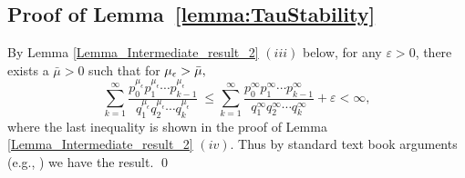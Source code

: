 
\subsection{Proof of Lemma~\ref{lemma:TauStability}}
\label{sec:lemma:TauStability}

By Lemma \ref{Lemma_Intermediate_result_2} $(iii)$ below, for any
$\varepsilon > 0$, there exists a $\bar{\mu} > 0$ such that for
${\mu_\epsilon} > \bar{\mu},$
$$
\sum_{k = 1}^{\infty} \frac{p_0^{\mu_\epsilon} p_1^{\mu_\epsilon} \cdots p_{k-1}^{\mu_\epsilon}}{q_1^{\mu_\epsilon} q_2^{\mu_\epsilon} \cdots q_k^{\mu_\epsilon}}
	\ \le 
	\sum_{k = 1}^{\infty} \frac{p_0^{\infty} p_1^{\infty } \cdots p_{k-1}^{\infty }}{q_1^{\infty } q_2^{ \infty  } \cdots q_k^{\infty  }}  + \varepsilon  < \infty,
	$$where the last inequality is shown in the proof of  Lemma \ref{Lemma_Intermediate_result_2} $(iv)$.  Thus by standard text book arguments (e.g., \cite{Hoel}) we have the result. \qed


